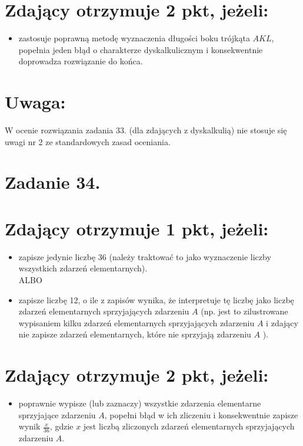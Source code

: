 \documentclass[10pt]{article}
\begin{document}
\section*{Zdający otrzymuje 2 pkt, jeżeli:}
\begin{itemize}
  \item zastosuje poprawną metodę wyznaczenia długości boku trójkąta $A K L$, popełnia jeden błąd o charakterze dyskalkulicznym i konsekwentnie doprowadza rozwiązanie do końca.
\end{itemize}

\section*{Uwaga:}
W ocenie rozwiązania zadania 33. (dla zdających z dyskalkulią) nie stosuje się uwagi nr 2 ze standardowych zasad oceniania.

\section*{Zadanie 34.}
\section*{Zdający otrzymuje 1 pkt, jeżeli:}
\begin{itemize}
  \item zapisze jedynie liczbę 36 (należy traktować to jako wyznaczenie liczby wszystkich zdarzeń elementarnych).\\
ALBO
  \item zapisze liczbę 12, o ile z zapisów wynika, że interpretuje tę liczbę jako liczbę zdarzeń elementarnych sprzyjających zdarzeniu $A$ (np. jest to zilustrowane wypisaniem kilku zdarzeń elementarnych sprzyjających zdarzeniu $A$ i zdający nie zapisze zdarzeń elementarnych, które nie sprzyjają zdarzeniu $A$ ).
\end{itemize}

\section*{Zdający otrzymuje 2 pkt, jeżeli:}
\begin{itemize}
  \item poprawnie wypisze (lub zaznaczy) wszystkie zdarzenia elementarne sprzyjające zdarzeniu $A$, popełni błąd w ich zliczeniu i konsekwentnie zapisze wynik $\frac{x}{36}$, gdzie $x$ jest liczbą zliczonych zdarzeń elementarnych sprzyjających zdarzeniu $A$.
\end{itemize}
\end{document}
